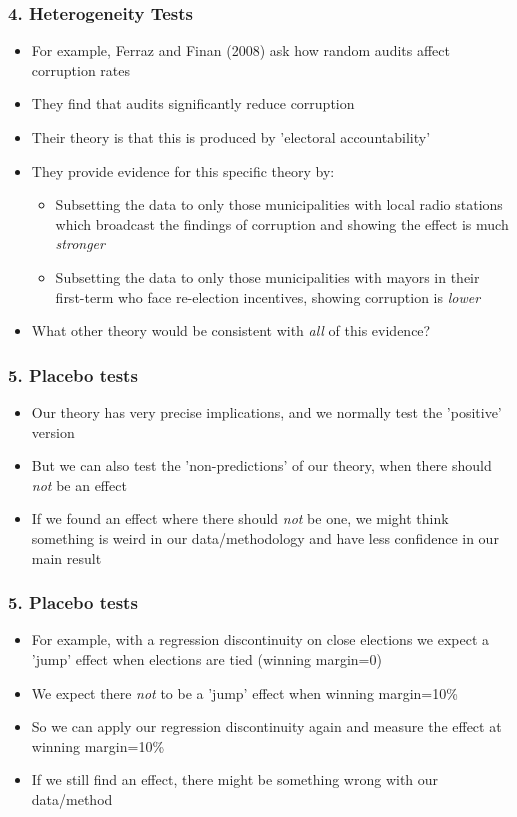\documentclass[xcolor=x11names,compress]{beamer}\usepackage[]{graphicx}\usepackage[]{color}
\renewcommand{\(}{\begin{columns}}
\renewcommand{\)}{\end{columns}}
\newcommand{\<}[1]{\begin{column}{#1}}
\renewcommand{\>}{\end{column}}
\begin{document}
\begin{frame}
\frametitle{4. Heterogeneity Tests}
\begin{itemize}
\item For example, Ferraz and Finan (2008) ask how random audits affect corruption rates
\pause
\item They find that audits significantly reduce corruption
\pause
\item Their theory is that this is produced by 'electoral accountability'   
\pause
\item They provide evidence for this specific theory by:
\pause
\begin{itemize}
\item Subsetting the data to only those municipalities with local radio stations which broadcast the findings of corruption and showing the effect is much \textit{stronger}
\pause
\item Subsetting the data to only those municipalities with mayors in their first-term who face re-election incentives, showing corruption is \textit{lower}
\pause
\end{itemize}
\item What other theory would be consistent with \textit{all} of this evidence?
\end{itemize}
\end{frame}

\begin{frame}
\frametitle{5. Placebo tests}
\begin{itemize}
\item Our theory has very precise implications, and we normally test the 'positive' version
\pause
\item But we can also test the 'non-predictions' of our theory, when there should \textit{not} be an effect
\pause
\item If we found an effect where there should \textit{not} be one, we might think something is weird in our data/methodology and have less confidence in our main result
\end{itemize}
\end{frame}

\begin{frame}
\frametitle{5. Placebo tests}
\begin{itemize}
\item For example, with a regression discontinuity on close elections we expect a 'jump' effect when elections are tied (winning margin=0)
\pause
\item We expect there \textit{not} to be a 'jump' effect when winning margin=10\%
\pause
\item So we can apply our regression discontinuity again and measure the effect at winning margin=10\%
\pause
\item If we still find an effect, there might be something wrong with our data/method
\end{itemize}
\end{frame}
\end{document}
